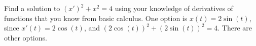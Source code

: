 {Find a solution to
${(x')}^2 + x^2 = 4$
using your knowledge of derivatives of functions that you
know from basic calculus.}
{One option is $x(t)=2\sin (t)$, since $x'(t) = 2\cos (t)$, and $(2\cos(t))^2+(2\sin(t))^2 = 4$. There are other options.}